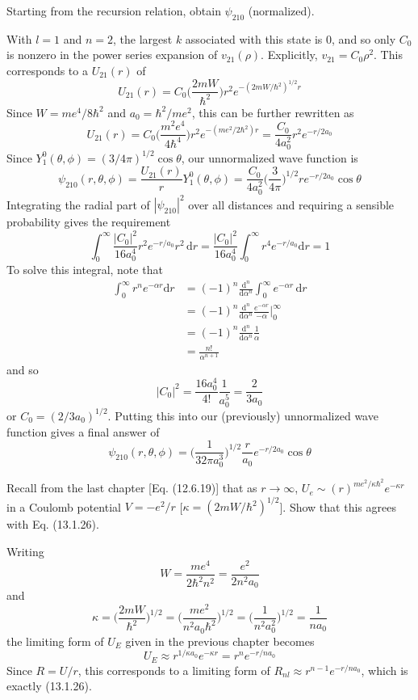 \documentclass[../principles-of-quantum-mechanics.tex]{subfiles}
\begin{document}
\begin{questions}
	\question Starting from the recursion relation, obtain $\psi_{210}$ (normalized).
	
	\begin{solution}
		With $l = 1$ and $n = 2$, the largest $k$ associated with this state is $0$, and so only $C_0$ is nonzero in the power series expansion of $v_{21}(\rho)$. Explicitly, $v_{21} = C_0\rho^{2}$. This corresponds to a $U_{21}(r)$ of
		$$U_{21}(r) = C_0\Big(\frac{2mW}{\hbar^2}\Big)r^2e^{-(2mW/\hbar^2)^{1/2}r}$$
		Since $W = me^4/8\hbar^2$ and $a_0 = \hbar^2/me^2$, this can be further rewritten as
		$$U_{21}(r) = C_0\Big(\frac{m^2e^4}{4\hbar^4}\Big)r^2 e^{-(me^2/2\hbar^2)r} = \frac{C_0}{4a_0^2}r^2e^{-r/2a_0}$$
		Since $Y_1^0(\theta, \phi) = (3/4\pi)^{1/2}\cos\theta$, our unnormalized wave function is
		$$\psi_{210}(r, \theta, \phi) = \frac{U_{21}(r)}{r}Y^0_1(\theta, \phi) = \frac{C_0}{4a_0^2}\Big(\frac{3}{4\pi}\Big)^{1/2}re^{-r/2a_0}\cos\theta$$
		Integrating the radial part of $|\psi_{210}|^2$ over all distances and requiring a sensible probability gives the requirement
		$$\int_0^\infty \frac{|C_0|^2}{16a_0^4}r^2e^{-r/a_0}r^2\,\mathrm{d}r = \frac{|C_0|^2}{16a_0^4}\int_0^\infty r^4e^{-r/a_0}\mathrm{d}r = 1$$
		To solve this integral, note that
		\begin{align*}
			\int_0^\infty r^n e^{-\alpha r}\mathrm{d}r &= (-1)^n\frac{\mathrm{d}^n}{\mathrm{d}\alpha^n}\int_0^\infty e^{-\alpha r}\,\mathrm{d}r \\
			&= (-1)^n\frac{\mathrm{d}^n}{\mathrm{d}\alpha^n}\frac{e^{-\alpha r}}{-\alpha}\Big|_0^\infty \\
			&= (-1)^n\frac{\mathrm{d}^n}{\mathrm{d}\alpha^n}\frac{1}{\alpha} \\
			&= \frac{n!}{\alpha^{n + 1}}
		\end{align*}
		and so
		$$|C_0|^2 = \frac{16a_0^4}{4!}\frac{1}{a_0^5} = \frac{2}{3a_0}$$
		or $C_0 = (2/3a_0)^{1/2}$. Putting this into our (previously) unnormalized wave function gives a final answer of
		$$\psi_{210}(r, \theta, \phi) = \Big(\frac{1}{32\pi a_0^3}\Big)^{1/2}\frac{r}{a_0}e^{-r/2a_0}\cos\theta$$
	\end{solution}
	
	\question Recall from the last chapter [Eq. (12.6.19)] that as $r\to\infty$, $U_e\sim (r)^{me^2/\kappa\hbar^2}e^{-\kappa r}$ in a Coulomb potential $V = -e^2/r$ [$\kappa = (2mW/\hbar^2)^{1/2}$]. Show that this agrees with Eq. (13.1.26).
	
	\begin{solution}
		Writing
		$$W = \frac{me^4}{2\hbar^2n^2} = \frac{e^2}{2n^2a_0}$$
		and
		$$\kappa = \Big(\frac{2mW}{\hbar^2}\Big)^{1/2} = \Big(\frac{me^2}{n^2a_0\hbar^2}\Big)^{1/2} = \Big(\frac{1}{n^2a_0^2}\Big)^{1/2} = \frac{1}{na_0}$$
		the limiting form of $U_E$ given in the previous chapter becomes
		$$U_E \approx r^{1/\kappa a_0}e^{-\kappa r} = r^{n}e^{-r/na_0}$$
		Since $R = U/r$, this corresponds to a limiting form of $R_{nl} \approx r^{n - 1}e^{-r/na_0}$, which is exactly (13.1.26).
	\end{solution}


\end{questions}
\end{document}
